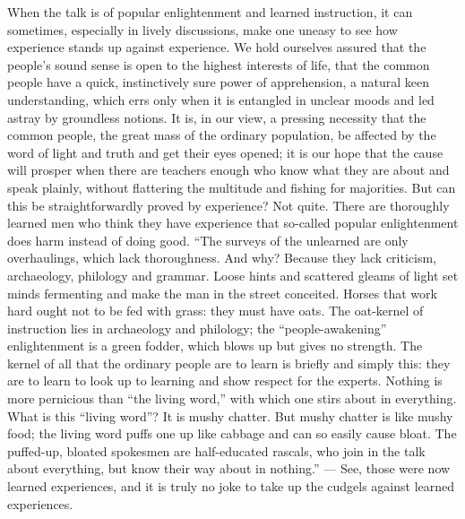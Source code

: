 \documentclass[12pt,a4paper,openany]{book}
\newcommand{\opage}[1]{\marginnote{\footnotesize\textit{[#1]}}}
\begin{document}
When the talk is of popular enlightenment and learned instruction,
it can sometimes, especially in lively discussions, make
one uneasy to see how experience stands up against
experience. We hold ourselves assured that the people's sound
sense is open to the highest interests of life, that the common
people have a quick, instinctively sure power of apprehension,
a natural keen understanding, which errs only
when it is entangled in unclear moods and led astray by
groundless notions. It is, in our view,
a pressing necessity that the common people,
the great mass of the ordinary population, be affected by the word of light
and truth and get their eyes opened; it is
our hope that the cause will prosper when there are teachers enough
who know what they are about and speak plainly, without flattering
the multitude and fishing for majorities. But can this be straightforwardly
proved by experience? Not quite. There are
thoroughly learned men who think they have experience that
so-called popular enlightenment does harm instead of doing
good. ``The surveys of the unlearned are only overhaulings, which
lack thoroughness. And why? Because they lack
criticism, archaeology, philology and grammar. Loose
hints and scattered gleams of light set minds fermenting
and make the man in the street conceited. Horses that work
hard ought not to be fed with grass: they must have
oats. The oat-kernel of instruction lies in archaeology
and philology; the ``people-awakening'' enlightenment is
a green fodder, which blows up but gives no strength.
The kernel of all that the ordinary people are to learn is briefly
\setcounter{footnote}{0}%
\opage{40}and simply this: they are to learn to look up to learning
and show respect for the experts. Nothing is
more pernicious than ``the living word,'' with which one
stirs about in everything. What is this ``living word''?
It is mushy chatter. But mushy chatter is like mushy food;
the living word puffs one up like cabbage and can so easily
cause bloat. The puffed-up, bloated spokesmen
are half-educated rascals, who join in the talk about everything,
but know their way about in nothing.'' --- See, those were now learned
experiences, and it is truly no joke to take up
the cudgels against learned experiences.
\end{document}
